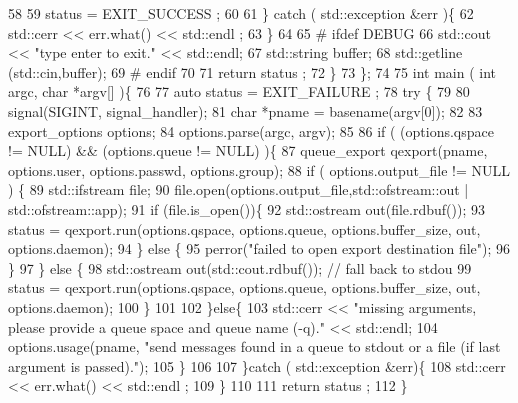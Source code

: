 \begin{DoxyCodeInclude}
58 
59         status = EXIT\_SUCCESS ;
60 
61       \} catch ( std::exception &err )\{
62         std::cerr << err.what() << std::endl ;
63       \}
64 
65 #     ifdef DEBUG
66       std::cout << "type enter to exit." << std::endl;
67       std::string buffer;
68       std::getline (std::cin,buffer);
69 #     endif
70 
71       return status ;
72     \}
73 \};
74 
75 int main ( int argc, char *argv[] )\{
76 
77   auto status = EXIT\_FAILURE ;
78   try \{
79 
80     signal(SIGINT, signal\_handler);
81     char *pname = basename(argv[0]);
82 
83     export\_options options;
84     options.parse(argc, argv);
85 
86     if ( (options.qspace != NULL) && (options.queue != NULL) )\{
87       queue\_export qexport(pname, options.user, options.passwd, options.group);
88       if ( options.output\_file != NULL ) \{
89         std::ifstream file;
90         file.open(options.output\_file,std::ofstream::out | std::ofstream::app);
91         if (file.is\_open())\{
92           std::ostream out(file.rdbuf());
93           status = qexport.run(options.qspace, options.queue, options.buffer\_size, out, options.daemon);
94         \} else \{
95           perror("failed to open export destination file");
96         \}
97       \} else \{
98         std::ostream out(std::cout.rdbuf()); // fall back to stdou
99         status = qexport.run(options.qspace, options.queue, options.buffer\_size, out, options.daemon);
100       \}
101 
102     \}else\{
103       std::cerr << "missing arguments, please provide a queue space and queue name (-q)." << std::endl;
104       options.usage(pname, "send messages found in a queue to stdout or a file (if last argument is
       passed).");
105     \}
106 
107   \}catch ( std::exception &err)\{
108     std::cerr << err.what() << std::endl ;
109   \}
110 
111   return status ;
112 \}
\end{DoxyCodeInclude}
 